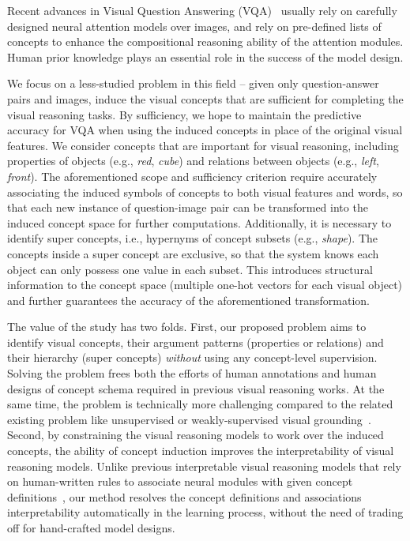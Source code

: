 \documentclass[10pt,twocolumn,letterpaper]{article}
\begin{document}
Recent advances in Visual Question Answering (VQA)~\cite{anderson2018bottom, perez2018film,hudson2018compositional, andreas2016neural, hu2017learning, johnson2017inferring, hu2018explainable, yi2018neural, mao2018neuro} usually rely on carefully designed neural attention models over images, and rely on pre-defined lists of concepts to enhance the compositional reasoning ability of the attention modules.
Human prior knowledge plays an essential role in the success of the model design.

We focus on a less-studied problem in this field -- given only question-answer pairs and images, induce the visual concepts that are sufficient for completing the visual reasoning tasks. 
By sufficiency, we hope to maintain the predictive accuracy for VQA when using the induced concepts in place of the original visual features.
We consider concepts that are important for visual reasoning, including properties of objects (e.g., \emph{red}, \emph{cube}) and relations between objects (e.g., \emph{left}, \emph{front}).
The aforementioned scope and sufficiency criterion require accurately associating the induced symbols of concepts to both visual features and words, so that each new instance of question-image pair can be transformed into the induced concept space for further computations.
Additionally, it is necessary to identify super concepts, i.e., hypernyms of concept subsets (e.g., \emph{shape}). The concepts inside a super concept are exclusive, so that the system knows each object can only possess one value in each subset.
This introduces structural information to the concept space (multiple one-hot vectors for each visual object) and further guarantees the accuracy of the aforementioned transformation.

The value of the study has two folds.
First, our proposed problem aims to identify visual concepts, their argument patterns (properties or relations) and their hierarchy (super concepts) \emph{without} using any concept-level supervision. Solving the problem frees both the efforts of human annotations and human designs of concept schema required in previous visual reasoning works. At the same time, the problem is technically more challenging compared to the related existing problem like unsupervised or weakly-supervised visual grounding~\cite{yeh2018unsupervised}.
Second, by constraining the visual reasoning models to work over the induced concepts, the ability of concept induction improves the interpretability of visual reasoning models.
Unlike previous interpretable visual reasoning models that rely on human-written rules to associate neural modules with given concept definitions~\cite{hu2018explainable,mao2018neuro,shi2019explainable}, our method resolves the concept definitions and associations interpretability automatically in the learning process, without the need of trading off for hand-crafted model designs.
\end{document}
